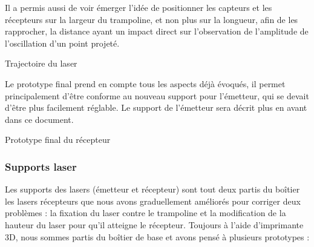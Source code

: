Il a permis aussi de voir émerger l’idée de positionner les capteurs et les récepteurs sur la largeur du trampoline, et non plus sur la longueur, afin de les rapprocher, la distance ayant un impact direct sur l’observation de l’amplitude de l'oscillation d’un point projeté.

\begin{center}
  
  Trajectoire du laser
\end{center}

Le prototype final prend en compte tous les aspects déjà évoqués, il permet principalement d’être conforme au nouveau support pour l'émetteur, qui se devait d’être plus facilement réglable. Le support de l'émetteur sera décrit plus en avant dans ce document.

\begin{center}
  
  Prototype final du récepteur
\end{center}

\subsubsection{Supports laser}
Les supports des lasers (émetteur et récepteur) sont tout deux partis du boîtier les lasers récepteurs que nous avons graduellement améliorés pour corriger deux problèmes : la fixation du laser contre le trampoline et la modification de la hauteur du laser pour qu’il atteigne le récepteur. Toujours à l’aide d’imprimante 3D, nous sommes partis du boîtier de base et avons pensé à plusieurs prototypes :

